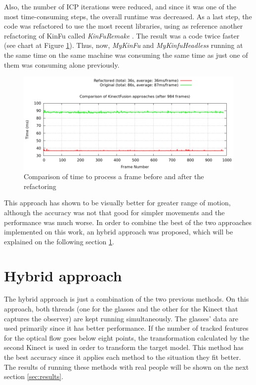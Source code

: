 \documentclass[msc, a4paper, classic, en]{ufbathesis}
\begin{document}
Also, the number of ICP iterations were reduced, and since it was one of the most time-consuming steps, the overall runtime was decreased. As a last step, the code was refactored to use the most recent libraries, using as reference another refactoring of KinFu called \textit{KinFuRemake} \cite{kinfuremake}. The result was a code twice faster (see chart at Figure \ref{fig:kinfuchart}). Thus, now, \textit{MyKinFu} and \textit{MyKinfuHeadless} running at the same time on the same machine was consuming the same time as just one of them was consuming alone previously.

\begin{figure}
\centering
\includegraphics[width=1\textwidth]{images/plot.png}
\caption{Comparison of time to process a frame before and after the refactoring}
\label{fig:kinfuchart}
\end{figure}

This approach has shown to be visually better for greater range of motion, although the accuracy was not that good for simpler movements and the performance was much worse. In order to combine the best of the two approaches implemented on this work, an hybrid approach was proposed, which will be explained on the following section \ref{sec:hybrid}.

\section{Hybrid approach}
\label{sec:hybrid}

The hybrid approach is just a combination of the two previous methods. On this approach, both threads (one for the glasses and the other for the Kinect that captures the observer) are kept running simultaneously. The glasses' data are used primarily since it has better performance. If the number of tracked features for the optical flow goes below eight points, the transformation calculated by the second Kinect is used in order to transform the target model. This method has the best accuracy since it applies each method to the situation they fit better. The results of running these methods with real people will be shown on the next section \ref{sec:results}. 
\end{document}
